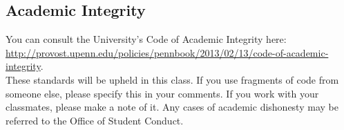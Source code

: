 \documentclass[12pt]{amsart}
\begin{document}
\subsection*{Academic Integrity}
You can consult the University's Code of Academic Integrity here:
{\small \url{http://provost.upenn.edu/policies/pennbook/2013/02/13/code-of-academic-integrity}}.\\
These standards will be upheld in this class. If you use fragments of code from
someone else, please specify this in your comments.
If you work with your classmates, please make a note of it.
Any cases of academic dishonesty may 
be referred to the Office of Student Conduct.
\end{document}
